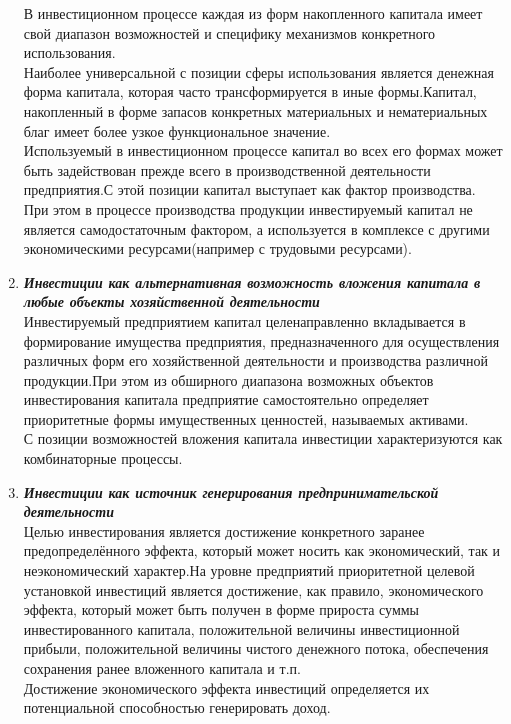 \documentclass[a4paper,12pt]{article}
\begin{document}
\begin{flushleft}
\begin{enumerate}
			В инвестиционном процессе каждая из форм накопленного капитала имеет свой диапазон возможностей и специфику механизмов конкретного использования.\\
			Наиболее универсальной с позиции сферы использования является денежная форма капитала, которая часто трансформируется в иные формы.Капитал, накопленный в форме запасов конкретных материальных и нематериальных благ имеет более узкое функциональное значение.\\
			Используемый в инвестиционном процессе капитал во всех его формах может быть задействован прежде всего в производственной деятельности предприятия.С этой позиции капитал выступает как фактор производства.\\
			При этом в процессе производства продукции инвестируемый капитал не является самодостаточным  фактором, а используется в комплексе с другими экономическими ресурсами(например с трудовыми ресурсами).
			\newpage       
				\item \textbf{\textit{Инвестиции как альтернативная возможность вложения капитала в любые объекты хозяйственной деятельности }}\\ \medskip
			Инвестируемый предприятием капитал целенаправленно вкладывается в формирование имущества предприятия, предназначенного для осуществления различных форм его хозяйственной деятельности и производства различной продукции.При этом из обширного диапазона возможных объектов инвестирования капитала предприятие самостоятельно определяет приоритетные формы имущественных ценностей, называемых активами.\\
			С позиции возможностей вложения капитала инвестиции характеризуются как комбинаторные процессы.      				 							\item \textbf{\textit{Инвестиции как источник генерирования предпринимательской деятельности}}\\ \medskip
			Целью инвестирования является достижение конкретного заранее предопределённого эффекта, который может носить как экономический, так и неэкономический характер.На уровне предприятий приоритетной целевой установкой инвестиций является достижение, как правило, экономического эффекта, который может быть получен в форме прироста суммы инвестированного капитала, положительной величины  инвестиционной прибыли, положительной величины чистого денежного потока, обеспечения сохранения ранее вложенного капитала и т.п.\\
			Достижение экономического эффекта инвестиций определяется их потенциальной способностью генерировать доход. 	 

\end{enumerate}
\end{flushleft}
\end{document}
